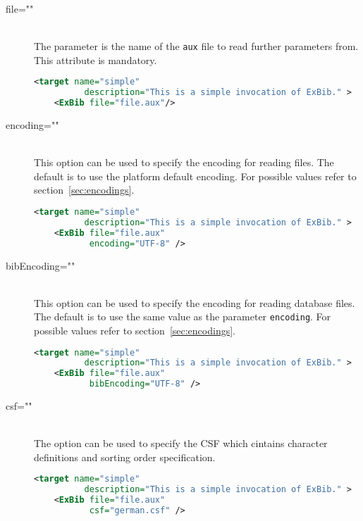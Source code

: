 \begin{description}
\item[file=""] \ \\
  The parameter is the name of the \texttt{aux} file to read further
  parameters from. This attribute is mandatory.

\begin{lstlisting}[language=XML,morekeywords={target}]
  <target name="simple"
          description="This is a simple invocation of ExBib." >
    <ExBib file="file.aux"/>
\end{lstlisting}

\item[encoding=""] \ \\
  This option can be used to specify the encoding for reading files.
  The default is to use the platform default encoding. For possible
  values refer to section~\ref{sec:encodings}.

\begin{lstlisting}[language=XML,morekeywords={target}]
  <target name="simple"
          description="This is a simple invocation of ExBib." >
    <ExBib file="file.aux"
           encoding="UTF-8" />
\end{lstlisting}

\item[bibEncoding=""] \ \\
  This option can be used to specify the encoding for reading database
  files. The default is to use the same value as the parameter
  \texttt{encoding}.  For possible values refer to
  section~\ref{sec:encodings}.

\begin{lstlisting}[language=XML,morekeywords={target}]
  <target name="simple"
          description="This is a simple invocation of ExBib." >
    <ExBib file="file.aux"
           bibEncoding="UTF-8" />
\end{lstlisting}

\item[csf=""] \ \\
  The option can be used to specify the CSF which cintains character
  definitions and sorting order specification.

\begin{lstlisting}[language=XML,morekeywords={target}]
  <target name="simple"
          description="This is a simple invocation of ExBib." >
    <ExBib file="file.aux"
           csf="german.csf" />
\end{lstlisting}


\end{description}
